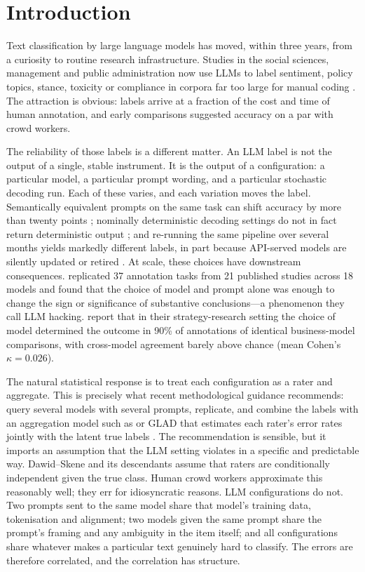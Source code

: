 \section{Introduction}\label{sec:intro}

Text classification by large language models has moved, within three years, from a curiosity to routine research infrastructure. Studies in the social sciences, management and public administration now use LLMs to label sentiment, policy topics, stance, toxicity or compliance in corpora far too large for manual coding \citep{Gilardi2023,Carlson2025}. The attraction is obvious: labels arrive at a fraction of the cost and time of human annotation, and early comparisons suggested accuracy on a par with crowd workers.

The reliability of those labels is a different matter. An LLM label is not the output of a single, stable instrument. It is the output of a configuration: a particular model, a particular prompt wording, and a particular stochastic decoding run. Each of these varies, and each variation moves the label. Semantically equivalent prompts on the same task can shift accuracy by more than twenty points \citep{Liu2026}; nominally deterministic decoding settings do not in fact return deterministic output \citep{Atil2024}; and re-running the same pipeline over several months yields markedly different labels, in part because API-served models are silently updated or retired \citep{Barrie2025}. At scale, these choices have downstream consequences. \citet{Baumann2025} replicated 37 annotation tasks from 21 published studies across 18 models and found that the choice of model and prompt alone was enough to change the sign or significance of substantive conclusions---a phenomenon they call LLM hacking. \citet{Camuffo2026} report that in their strategy-research setting the choice of model determined the outcome in 90\% of annotations of identical business-model comparisons, with cross-model agreement barely above chance (mean Cohen's $\kappa = 0.026$).

The natural statistical response is to treat each configuration as a rater and aggregate. This is precisely what recent methodological guidance recommends: query several models with several prompts, replicate, and combine the labels with an aggregation model such as \citet{Dawid1979} or GLAD \citep{Whitehill2009} that estimates each rater's error rates jointly with the latent true labels \citep{Camuffo2026}. The recommendation is sensible, but it imports an assumption that the LLM setting violates in a specific and predictable way. Dawid--Skene and its descendants assume that raters are conditionally independent given the true class. Human crowd workers approximate this reasonably well; they err for idiosyncratic reasons. LLM configurations do not. Two prompts sent to the same model share that model's training data, tokenisation and alignment; two models given the same prompt share the prompt's framing and any ambiguity in the item itself; and all configurations share whatever makes a particular text genuinely hard to classify. The errors are therefore correlated, and the correlation has structure.


